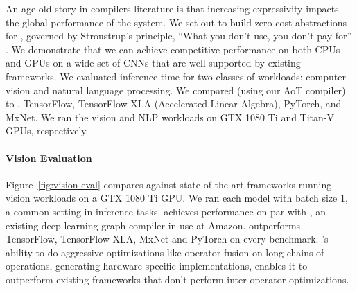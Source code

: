   \begin{figure}[h]
  \end{figure}

  \begin{figure}[h]
  \end{figure}

  An age-old story in compilers literature is that increasing expressivity
    impacts the global performance of the system.
  We set out to build zero-cost abstractions for \relay,
    governed by Stroustrup's principle, ``What you don't use, you don't pay
    for'' \citep{bjarne}.
  We demonstrate that we can achieve competitive performance on both CPUs and
    GPUs on a wide set of CNNs that are well supported by existing frameworks.
  We evaluated inference time for two classes of workloads: computer vision and natural language processing.
  We compared \relay (using our AoT compiler) to \nnvm,
    TensorFlow, TensorFlow-XLA (Accelerated Linear Algebra), PyTorch, and MxNet.
  We ran the vision and NLP workloads on GTX 1080 Ti and Titan-V GPUs, respectively.

  \paragraph{Vision Evaluation}
  Figure~\ref{fig:vision-eval} compares \relay against state of the art frameworks
    running vision workloads on a GTX 1080 Ti GPU.
  We ran each model with
    batch size 1, a common setting in inference tasks.
  \relay achieves performance on par with \nnvm,
    an existing deep learning graph compiler in use at Amazon.
  \relay outperforms TensorFlow, TensorFlow-XLA, MxNet and
    PyTorch on every benchmark.
  \relay's ability to do aggressive optimizations like operator
    fusion on long chains of operations, generating hardware
    specific implementations, enables it to outperform
    existing frameworks that don't perform inter-operator optimizations.


